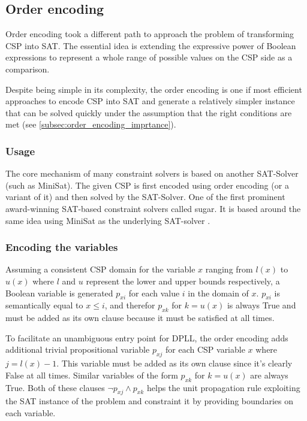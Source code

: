 \subsection{Order encoding}

Order encoding took a different path to approach the problem of transforming CSP into SAT. The essential idea is extending the expressive power of Boolean expressions to represent a whole range of possible values on the CSP side as a comparison.

Despite being simple in its complexity, the order encoding is one if most efficient approaches to encode CSP into SAT and generate a relatively simpler instance that can be solved quickly under the assumption that the right conditions are met (see \ref{subsec:order_encoding_imprtance}).

\subsubsection{Usage}
The core mechanism of many constraint solvers is based on another SAT-Solver (such as MiniSat\cite{tamura2008sugar}). The given CSP is first encoded using order encoding (or a variant of it) and then solved by the SAT-Solver. One of the first prominent award-winning SAT-based constraint solvers called sugar. It is based around the same idea using MiniSat as the underlying SAT-solver \cite{tamura2008sugar}.

\subsubsection{Encoding the variables}
Assuming a consistent CSP domain for the variable $x$ ranging from $l(x)$ to $u(x)$ where $l$ and $u$ represent the lower and upper bounds respectively, a Boolean variable is generated $p_{xi}$ for each value $i$ in the domain of $x$. $p_{xi}$ is semantically equal to $x \leq i$, and therefor $p_{xk}$ for $k = u(x)$ is always True and must be added as its own clause because it must be satisfied at all times.

To facilitate an unambiguous entry point for DPLL, the order encoding adds additional trivial propositional variable  $p_{xj}$ for each CSP  variable $x$ where $j = l(x) - 1$. This variable must be added as its own clause since it's clearly False at all times. Similar variables of the form $p_{xk}$ for  $k = u(x)$ are always True. Both of these clauses $\neg p_{xj} \wedge p_{xk}$ helps the unit propagation rule exploiting the SAT instance of the problem and constraint it by providing boundaries on each variable.

